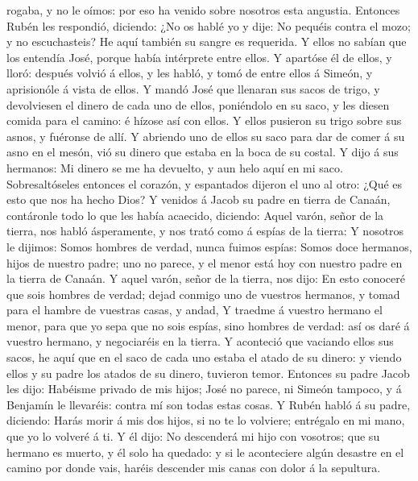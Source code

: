 rogaba, y no le oímos: por eso ha venido sobre nosotros esta angustia.
 Entonces Rubén les respondió, diciendo: ¿No os hablé yo y
dije: No pequéis contra el mozo; y no escuchasteis? He aquí también su
sangre es requerida.  Y ellos no sabían que los entendía
José, porque había intérprete entre ellos.  Y apartóse él
de ellos, y lloró: después volvió á ellos, y les habló, y tomó de entre
ellos á Simeón, y aprisionóle á vista de ellos.  Y mandó
José que llenaran sus sacos de trigo, y devolviesen el dinero de cada
uno de ellos, poniéndolo en su saco, y les diesen comida para el camino:
é hízose así con ellos.  Y ellos pusieron su trigo sobre
sus asnos, y fuéronse de allí.  Y abriendo uno de ellos su
saco para dar de comer á su asno en el mesón, vió su dinero que estaba
en la boca de su costal.  Y dijo á sus hermanos: Mi dinero
se me ha devuelto, y aun helo aquí en mi saco. Sobresaltóseles entonces
el corazón, y espantados dijeron el uno al otro: ¿Qué es esto que nos ha
hecho Dios?  Y venidos á Jacob su padre en tierra de
Canaán, contáronle todo lo que les había acaecido, diciendo:
 Aquel varón, señor de la tierra, nos habló ásperamente, y
nos trató como á espías de la tierra:  Y nosotros le
dijimos: Somos hombres de verdad, nunca fuimos espías: 
Somos doce hermanos, hijos de nuestro padre; uno no parece, y el menor
está hoy con nuestro padre en la tierra de Canaán.  Y aquel
varón, señor de la tierra, nos dijo: En esto conoceré que sois hombres
de verdad; dejad conmigo uno de vuestros hermanos, y tomad para el
hambre de vuestras casas, y andad,  Y traedme á vuestro
hermano el menor, para que yo sepa que no sois espías, sino hombres de
verdad: así os daré á vuestro hermano, y negociaréis en la tierra.
 Y aconteció que vaciando ellos sus sacos, he aquí que en
el saco de cada uno estaba el atado de su dinero: y viendo ellos y su
padre los atados de su dinero, tuvieron temor.  Entonces su
padre Jacob les dijo: Habéisme privado de mis hijos; José no parece, ni
Simeón tampoco, y á Benjamín le llevaréis: contra mí son todas estas
cosas.  Y Rubén habló á su padre, diciendo: Harás morir á
mis dos hijos, si no te lo volviere; entrégalo en mi mano, que yo lo
volveré á ti.  Y él dijo: No descenderá mi hijo con
vosotros; que su hermano es muerto, y él solo ha quedado: y si le
aconteciere algún desastre en el camino por donde vais, haréis descender
mis canas con dolor á la sepultura.

